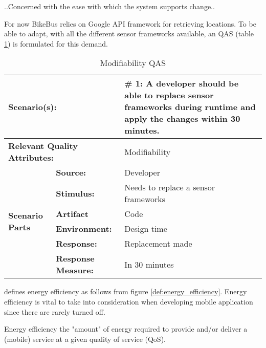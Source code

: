 \begin{defi}
..Concerned with the ease with which the system supports change..  
  \label{def:modifiability}
\end{defi}

 For now BikeBus relies on Google API framework for retrieving locations. To be able to adapt, with all the different sensor frameworks available, an QAS (table \ref{table:modifiability_qas}) is formulated for this demand. 

\begin{table}[H]
\begin{center}
\begin{tabular}{|p{0.3cm}|p{2.5cm}|p{8cm}|}
  \hline
  \multicolumn{2}{|p{3cm}|}{\bfseries Scenario(s):} & \#  1: A developer should be able to replace sensor frameworks during runtime and apply the changes within 30 minutes. \\
  \hline
  \multicolumn{2}{|p{3cm}|}{\bfseries Relevant Quality Attributes:} & Modifiability\\
  \hline
  \multirow{6}{*}{\begin{sideways}{\bfseries Scenario Parts}\end{sideways}}
  & {\bfseries Source:} & Developer \\
  \cline{2-3}
  & {\bfseries Stimulus:} & Needs to replace a sensor frameworks \\
  \cline{2-3}
  & {\bfseries Artifact} &  Code \\
  \cline{2-3}
  & {\bfseries Environment:} &  Design time \\
  \cline{2-3}
  & {\bfseries Response:} &  Replacement made\\
  \cline{2-3}
  & {\bfseries Response Measure:} & In 30 minutes\\
  \hline
\end{tabular}
\caption{Modifiability QAS}
\label{table:modifiability_qas}
\end{center}
  
\end{table}

\cite{Kjaergaard:2015:AQT:2737182.2737196} defines energy efficiency as follows from figure \ref{def:energy_efficiency}. Energy efficiency is vital to take into consideration when developing mobile application since there are rarely turned off.  

\begin{defi}
Energy efficiency the "amount" of energy required to provide and/or deliver a (mobile)
service at a given quality of service (QoS).  
  \label{def:energy_efficiency}
\end{defi}

